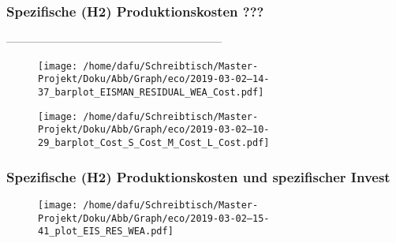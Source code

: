 \documentclass[onecolumn,10pt,titlepage]{article}
\begin{document}
\subsubsection{Spezifische (H2) Produktionskosten ???}
%
-----------------------------------------------------------
\begin{figure}[!tbp]
	\centering
	\begin{minipage}[b]{0.49\textwidth}
	\texttt{[image: /home/dafu/Schreibtisch/Master-Projekt/Doku/Abb/Graph/eco/2019-03-02--14-37\_barplot\_EISMAN\_RESIDUAL\_WEA\_Cost.pdf]}
\caption{ }
\label{fig:analy_nC_speCo} 
	\end{minipage}
	\hfill
	\begin{minipage}[b]{0.49\textwidth}
	\texttt{[image: /home/dafu/Schreibtisch/Master-Projekt/Doku/Abb/Graph/eco/2019-03-02--10-29\_barplot\_Cost\_S\_Cost\_M\_Cost\_L\_Cost.pdf]}
\caption{ }
\label{fig:analy_COST_speCo} 
	\end{minipage}
\end{figure}

\subsubsection{Spezifische (H2) Produktionskosten und spezifischer Invest}
\begin{figure}[H]
	
	\centering
	\texttt{[image: /home/dafu/Schreibtisch/Master-Projekt/Doku/Abb/Graph/eco/2019-03-02--15-41\_plot\_EIS\_RES\_WEA.pdf]}
	\caption{ }
	\label{fig:analy_ecoVAls_all} 
\end{figure}
\end{document}

